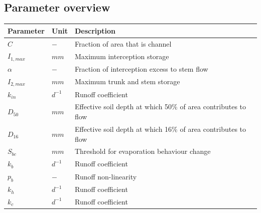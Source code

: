 \newpage
\subsection{Parameter overview}
\begin{table}[htbp]
  \centering
    \begin{tabular}{lll}
    \toprule
    Parameter & Unit  & Description \\
    \midrule
    $C$   & $-$   & Fraction of area that is channel \\
    $I_{1,max}$ & $mm$  & Maximum interception storage \\
    $\alpha$ & $-$   & Fraction of interception excess to stem flow \\
    $I_{2,max}$ & $mm$  & Maximum trunk and stem storage \\
    $k_{in}$ & $d^{-1}$ & Runoff coefficient \\
    $D_{50}$ & $mm$  & Effective soil depth at which 50\% of area contributes to flow \\
    $D_{16}$ & $mm$  & Effective soil depth at which 16\% of area contributes to flow \\
    $S_{bc}$ & $mm$  & Threshold for evaporation behaviour change \\
    $k_b$ & $d^{-1}$ & Runoff coefficient \\
    $p_b$ & $-$   & Runoff non-linearity \\
    $k_h$ & $d^{-1}$ & Runoff coefficient \\
    $k_c$ & $d^{-1}$ & Runoff coefficient \\
    \bottomrule
    \end{tabular}%
  \label{tab:addlabel}%
\end{table}%


